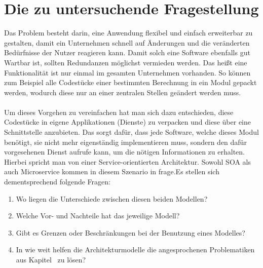 \section{Die zu untersuchende Fragestellung}
\label{sec:dasProblem}
Das Problem besteht darin, eine Anwendung flexibel und einfach erweiterbar zu gestalten, damit ein Unternehmen schnell auf Änderungen und die veränderten Bedürfnisse der Nutzer reagieren kann. Damit solch eine Software ebenfalls gut Wartbar ist, sollten Redundanzen möglichst vermieden werden. Das heißt eine Funktionalität ist nur einmal im gesamten Unternehmen vorhanden. So können zum Beispiel alle Codestücke einer bestimmten Berechnung in ein Modul gepackt werden, wodurch diese  nur an einer zentralen Stellen geändert werden muss.
\\\\
Um dieses Vorgehen zu vereinfachen hat man sich dazu entschieden, diese Codestücke in eigene Applikationen (Dienste) zu verpacken und diese über eine Schnittstelle anzubieten. Das sorgt dafür, dass jede Software, welche dieses Modul benötigt, sie nicht mehr eigenständig implementieren muss, sondern den dafür vorgesehenen Dienst aufrufe kann, um die nötigen Informationen zu erhalten. Hierbei spricht man von einer Service-orientierten Architektur. Sowohl SOA als auch Microservice kommen in diesem Szenario in frage.Es stellen sich dementsprechend folgende Fragen:
\begin{enumerate}
    \item Wo liegen die Unterschiede zwischen diesen beiden Modellen?
    \item Welche Vor- und Nachteile hat das jeweilige Modell?
    \item Gibt es Grenzen oder Beschränkungen bei der Benutzung eines Modelles?
    \item In wie weit helfen die Architekturmodelle die angesprochenen Problematiken aus Kapitel \ zu lösen?
\end{enumerate}
     